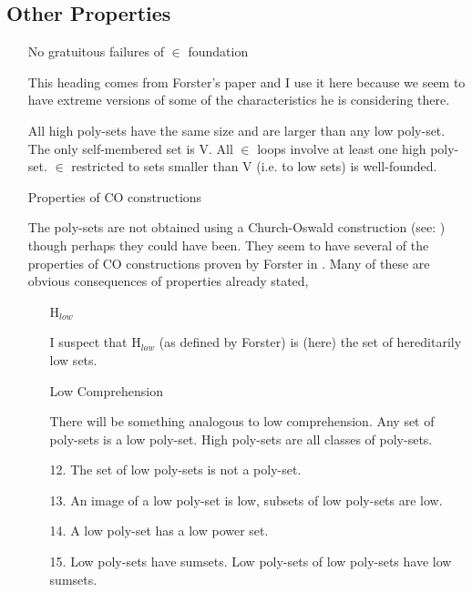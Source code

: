 \documentclass[numreferences]{rbjk}
\begin{document}
\begin{article}
\begin{enumerate}
\end{enumerate}

\subsection{Other Properties}

\begin{itemize}

\item[No gratuitous failures of $\in$ foundation]\ 

This heading comes from Forster's paper \cite{forster2006} and I use it here because we seem to have extreme versions of some of the characteristics he is considering there.

All high poly-sets have the same size and are larger than any low poly-set.
The only self-membered set is V.
All $\in$ loops involve at least one high poly-set.
$\in$ restricted to sets smaller than V (i.e. to low sets) is well-founded.

\item[Properties of CO constructions]\ 

The poly-sets are not obtained using a Church-Oswald construction (see: \cite{forster2005}) though perhaps they could have been.
They seem to have several of the properties of CO constructions proven by Forster in \cite{forster2005}.
Many of these are obvious consequences of properties already stated,

\begin{itemize}

\item[H$_{low}$]\ 

I suspect that H$_{low}$ (as defined by Forster\cite{forster2005}) is (here) the set of hereditarily low sets.

\item[Low Comprehension]\ 

There will be something analogous to low comprehension.
Any set of poly-sets is a low poly-set.
High poly-sets are all classes of poly-sets.

\item[12.] The set of low poly-sets is not a poly-set.

\item[13.] An image of a low poly-set is low, subsets of low poly-sets are low.

\item[14.] A low poly-set has a low power set.

\item[15.] Low poly-sets have sumsets. Low poly-sets of low poly-sets have low sumsets.

\end{itemize}
\end{itemize}

{\raggedright


} %


\end{article}
\end{document}

